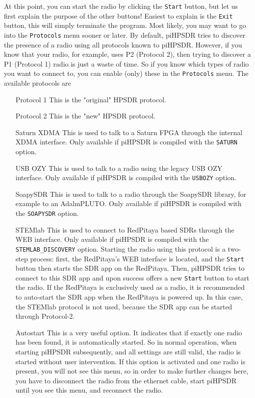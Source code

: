 \documentclass[12pt]{book}
\def\rett#1{\texttt{\color{red}#1}}
\begin{document}
At this point, you can start the radio by clicking the \rett{Start} button, but let us first explain the
purpose of the other buttons! Easiest to explain is the \rett{Exit} button, this will simply terminate
the program. Most likely, you may want to go into the \rett{Protocols} menu sooner or later.
 By default, piHPSDR tries to
discover the presence of a radio using all protocols known to piHPSDR. However, if you know that your radio, for
example, uses P2 (Protocol 2), then trying to discover a P1 (Protocol 1) radio is just a waste of time. So if you
know which types of radio you want to connect to, you can enable (only) these in the \rett{Protocols} menu.
The available protocols are
\begin{itemize}[font=\texttt, left=80pt]
\item[Protocol 1]{This is the "original" HPSDR protocol.}
\item[Protocol 2]{This is the "new" HPSDR protocol.}
\item[Saturn XDMA]{This is used to talk to a Saturn FPGA through the internal XDMA interface. Only available
if piHPSDR is compiled with the \texttt{SATURN}  option.}
\item[USB OZY]{This is used to talk to a radio using the legacy USB OZY interface. Only available if piHPSDR
is compiled with the \texttt{USBOZY} option.}
\item[SoapySDR]{This is used to talk to a radio through the SoapySDR library, for example to an AdalmPLUTO. 
Only available if piHPSDR is compiled with the \texttt{SOAPYSDR} option.}
\item[STEMlab]{This is used to connect to RedPitaya based SDRs through the WEB interface. Only available if piHPSDR is
compiled with the \texttt{STEMLAB\_DISCOVERY} option. Starting the radio using this protocol is a two-step process:
first, the RedPitaya's WEB interface is located, and the \texttt{Start} button then starts the SDR app
on the RedPitaya. Then, piHPSDR tries to connect to this SDR app and upon success offers a new \texttt{Start} button
to start the radio. If the RedPitaya is exclusively used as a radio, it is recommended to auto-start the SDR app
when the RedPitaya is powered up. In this case, the STEMlab protocol is not used, because the SDR app can be started
through Protocol-2.}
\item[Autostart]{This is a very useful option. It indicates that if exactly one radio has been found, it is automatically
started. So in normal operation, when starting piHPSDR subsequently, and all settings are still valid, the radio is
started without user intervention. If this option is activated and one radio is present, you will not see this menu, so in order
to make further changes here, you have to disconnect the radio from the ethernet cable, start piHPSDR until you see this
menu, and reconnect the radio.}
\end{itemize}
\end{document}
